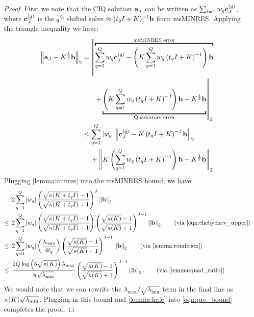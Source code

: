 \begin{proof}
  First we note that the CIQ solution $\mathbf{a}_J$ can be written as $\sum_{i=1} w_q \mathbf{c}^{(q)}_J$, where $\mathbf{c}^{(q)}_J$ is the $q^\text{th}$ shifted solve $\approx (t_q I + K)^{-1} \mathbf{b}$ from msMINRES.
  Applying the triangle inequality we have:
  \begin{align}
    \left\Vert \ba_J - \bK^{\frac 1 2} \bb \right\Vert_2
    &=
    \left\Vert \overbracket{\sum_{q=1}^Q w_q \bc^{(q)}_J - \left( \bK \sum_{q=1}^Q w_q \left( t_q \bI + \bK \right)^{-1} \right) \bb }^{\text{msMINRES error}} \right.
    \nonumber
    \\
    &\phantom{=} \quad \left. + \underbracket{\left( \bK \sum_{q=1}^Q w_q \left( t_q \bI + \bK \right)^{-1} \right) \bb - \bK^{\frac 1 2} \bb}_{\text{Quadrature error}} \right\Vert_2
    \nonumber
    \\
    &\leq \sum_{q=1}^Q \vert w_q \vert \left\Vert \bc^{(q)}_J - \bK \left( t_q \bI + \bK \right)^{-1} \bb \right\Vert_2
    \nonumber
    \\
    &\phantom{=} \:\: + \left\Vert \bK \left( \sum_{q=1}^Q w_q \left( t_q \bI + \bK \right)^{-1} \right) \bb - \bK^{\frac 1 2} \bb \right\Vert_2
    \label{eqn:pre_bound}
  \end{align}
  Plugging \cref{lemma:minres} into the msMINRES bound, we have:
  \begin{align*}
    &2 \sum_{q=1}^Q \left\vert w_q \right\vert
    \left( \frac{ \sqrt{\kappa(\bK + t_q \bI)} - 1}{ \sqrt{\kappa(\bK + t_q \bI)} + 1} \right)^J \left\Vert \bb \right\Vert_2
    \\
    \leq \:\:
    &2 \sum_{q=1}^Q \left\vert w_q \right\vert
    \left( \frac{ \sqrt{\kappa(\bK + t_q \bI)} - 1}{ \sqrt{\kappa(\bK + t_q \bI)} + 1} \right)
    \left( \frac{ \sqrt{\kappa(\bK)} - 1}{ \sqrt{\kappa(\bK)} + 1} \right)^{J-1}
    \left\Vert \bb \right\Vert_2
    \tag{via \eqref{eqn:chebychev_upper}}
    \\
    \leq \:\:
    &2 \sum_{q=1}^Q \left\vert w_q \right\vert
    \left( \frac{ \lambda_\text{max} }{ 4 t_q } \right)
    \left( \frac{ \sqrt{\kappa(\bK)} - 1}{ \sqrt{\kappa(\bK)} + 1} \right)^{J-1}
    \left\Vert \bb \right\Vert_2
    \tag{via \cref{lemma:condition}}
    \\
    \leq \:\:
    & \frac{ 2 Q \log \left( 5 \sqrt{\kappa(\bK)} \right) \lambda_\text{max}}{\pi \sqrt{\lambda_\text{min}}}
    \left( \frac{ \sqrt{\kappa(\bK)} - 1}{ \sqrt{\kappa(\bK)} + 1} \right)^{J-1}
    \left\Vert \bb \right\Vert_2.
    \tag{via \cref{lemma:quad_ratio}}
  \end{align*}
  We would note that we can rewrite the $\lambda_\text{max} / \sqrt{\lambda_\text{min}}$ term in the final line as $\kappa(K) \sqrt{\lambda_\text{min}}$.
  Plugging in this bound and \cref{lemma:hale} into \cref{eqn:pre_bound} completes the proof.
\end{proof}

